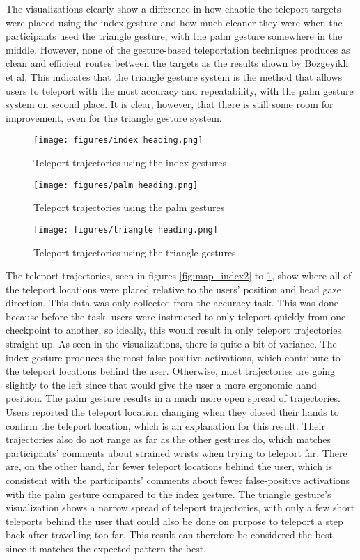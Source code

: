 The visualizations clearly show a difference in how chaotic the teleport targets were placed using the index gesture and how much cleaner they were when the participants used the triangle gesture, with the palm gesture somewhere in the middle. However, none of the gesture-based teleportation techniques produces as clean and efficient routes between the targets as the results shown by Bozgeyikli et al. This indicates that the triangle gesture system is the method that allows users to teleport with the most accuracy and repeatability, with the palm gesture system on second place. It is clear, however, that there is still some room for improvement, even for the triangle gesture system. 

\begin{figure}[!htb]
        \texttt{[image: figures/index heading.png]}
        \caption{Teleport trajectories using the index gestures}\label{fig:map_index2}
    \endminipage\hfill
        \texttt{[image: figures/palm heading.png]}
        \caption{Teleport trajectories using the palm gestures}\label{fig:map_palm2}
    \endminipage\hfill
        \texttt{[image: figures/triangle heading.png]}
        \caption{Teleport trajectories using the triangle gestures}\label{fig:map_triangle2}
    \endminipage
\end{figure}

The teleport trajectories, seen in figures \ref{fig:map_index2} to \ref{fig:map_triangle2}, show where all of the teleport locations were placed relative to the users' position and head gaze direction. This data was only collected from the accuracy task. This was done because before the task, users were instructed to only teleport quickly from one checkpoint to another, so ideally, this would result in only teleport trajectories straight up. As seen in the visualizations, there is quite a bit of variance. The index gesture produces the most false-positive activations, which contribute to the teleport locations behind the user. Otherwise, most trajectories are going slightly to the left since that would give the user a more ergonomic hand position. The palm gesture results in a much more open spread of trajectories. Users reported the teleport location changing when they closed their hands to confirm the teleport location, which is an explanation for this result. Their trajectories also do not range as far as the other gestures do, which matches participants' comments about strained wrists when trying to teleport far. There are, on the other hand, far fewer teleport locations behind the user, which is consistent with the participants' comments about fewer false-positive activations with the palm gesture compared to the index gesture. The triangle gesture's visualization shows a narrow spread of teleport trajectories, with only a few short teleports behind the user that could also be done on purpose to teleport a step back after travelling too far. This result can therefore be considered the best since it matches the expected pattern the best. 

